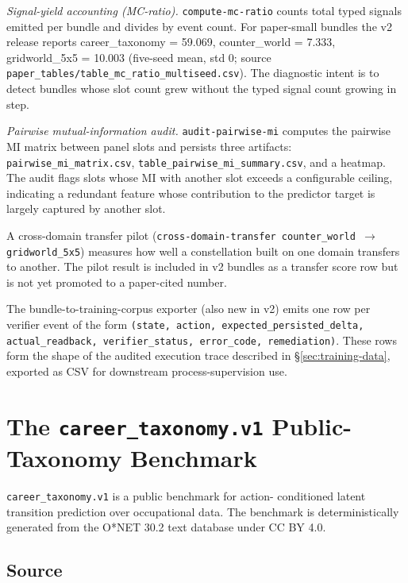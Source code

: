 \documentclass[10pt,twocolumn,letterpaper]{article}
\newcommand{\code}[1]{\texttt{\small #1}}
\begin{document}
\textit{Signal-yield accounting (MC-ratio).}
\code{compute-mc-ratio} counts total typed signals emitted per
bundle and divides by event count. For paper-small bundles the
v2 release reports career\_taxonomy = 59.069, counter\_world =
7.333, gridworld\_5x5 = 10.003 (five-seed mean, std 0; source
\code{paper\_tables/table\_mc\_ratio\_multiseed.csv}). The
diagnostic intent is to detect bundles whose slot count grew without
the typed signal count growing in step.

\textit{Pairwise mutual-information audit.}
\code{audit-pairwise-mi} computes the pairwise MI matrix between
panel slots and persists three artifacts:
\code{pairwise\_mi\_matrix.csv},
\code{table\_pairwise\_mi\_summary.csv}, and a heatmap. The audit
flags slots whose MI with another slot exceeds a configurable
ceiling, indicating a redundant feature whose contribution to the
predictor target is largely captured by another slot.

A cross-domain transfer pilot
(\code{cross-domain-transfer counter\_world $\to$ gridworld\_5x5})
measures how well a constellation built on one domain transfers to
another. The pilot result is included in v2 bundles as a transfer
score row but is not yet promoted to a paper-cited number.

The bundle-to-training-corpus exporter (also new in v2) emits one
row per verifier event of the form
\code{(state, action, expected\_persisted\_delta, actual\_readback,
verifier\_status, error\_code, remediation)}. These rows form the
shape of the audited execution trace described in
\S\ref{sec:training-data}, exported as CSV for downstream
process-supervision use.

\section{The \code{career\_taxonomy.v1} Public-Taxonomy Benchmark}
\label{sec:bench}

\code{career\_taxonomy.v1} is a public benchmark for action-
conditioned latent transition prediction over occupational data.
The benchmark is deterministically generated from the O*NET 30.2
text database under CC BY 4.0.

\subsection{Source}
\end{document}
